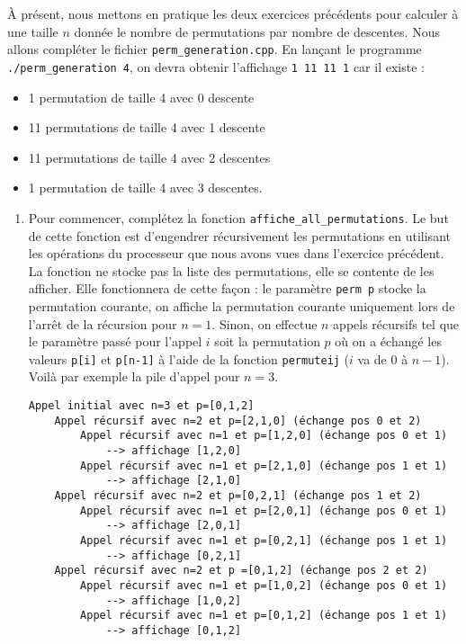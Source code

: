 \documentclass{cours}
\newcommand{\lsti}[1]{\lstinline{#1}{}}
\begin{document}
\begin{exercice}
\`A présent, nous mettons en pratique les deux exercices précédents pour calculer à une taille $n$ donnée le nombre de permutations par nombre de descentes. Nous allons compléter le fichier \lsti{perm_generation.cpp}. En lançant le programme \lsti{./perm_generation 4}, on devra obtenir l'affichage \lsti{1 11 11 1} car il existe :
\begin{itemize}
\item 1 permutation de taille 4 avec 0 descente
\item 11 permutations de taille 4 avec 1 descente
\item 11 permutations de taille 4 avec 2 descentes
\item 1 permutation de taille 4 avec 3 descentes.
\end{itemize}

\begin{enumerate}
\item Pour commencer, complétez la fonction \lsti{affiche_all_permutations}. Le but de cette fonction est d'engendrer récursivement les permutations en utilisant les opérations du processeur que nous avons vues dans l'exercice précédent. La fonction ne stocke pas la liste des permutations, elle se contente de les afficher. Elle fonctionnera de cette façon : le paramètre \lsti{perm p} stocke la permutation courante, on affiche la permutation courante uniquement lors de l'arrêt de la récursion pour $n=1$. Sinon, on effectue $n$ appels récursifs tel que le paramètre passé pour l'appel $i$ soit la permutation $p$ où on a échangé les valeurs \lsti{p[i]} et \lsti{p[n-1]} à l'aide de la fonction \lsti{permuteij} ($i$ va de 0 à $n-1$). Voilà par exemple la pile d'appel pour $n=3$.

\begin{lstlisting}
Appel initial avec n=3 et p=[0,1,2]
    Appel récursif avec n=2 et p=[2,1,0] (échange pos 0 et 2)
        Appel récursif avec n=1 et p=[1,2,0] (échange pos 0 et 1) 
            --> affichage [1,2,0]
        Appel récursif avec n=1 et p=[2,1,0] (échange pos 1 et 1)
            --> affichage [2,1,0]
    Appel récursif avec n=2 et p=[0,2,1] (échange pos 1 et 2)
        Appel récursif avec n=1 et p=[2,0,1] (échange pos 0 et 1)
            --> affichage [2,0,1]
        Appel récursif avec n=1 et p=[0,2,1] (échange pos 1 et 1)
            --> affichage [0,2,1]
    Appel récursif avec n=2 et p =[0,1,2] (échange pos 2 et 2)
        Appel récursif avec n=1 et p=[1,0,2] (échange pos 0 et 1)
            --> affichage [1,0,2]
        Appel récursif avec n=1 et p=[0,1,2] (échange pos 1 et 1)
            --> affichage [0,1,2]
\end{lstlisting}


\end{enumerate}
\end{exercice}
\end{document}
